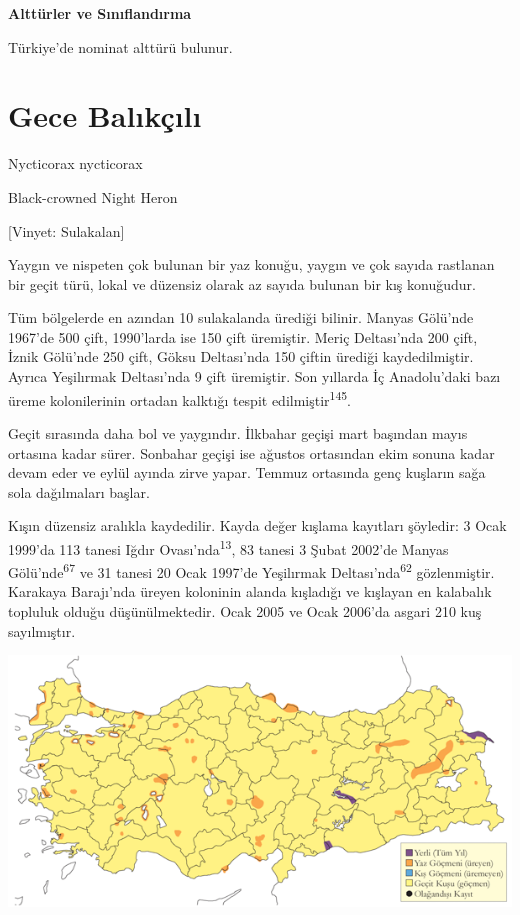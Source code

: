 \documentclass[
  letterpaper,
  DIV=11,
  numbers=noendperiod]{scrreprt}
\begin{document}
\textbf{Alttürler ve Sınıflandırma}

Türkiye'de nominat alttürü bulunur.

\section{Gece Balıkçılı}\label{gece-balux131kuxe7ux131lux131}

Nycticorax nycticorax

Black-crowned Night Heron

{[}Vinyet: Sulakalan{]}

Yaygın ve nispeten çok bulunan bir yaz konuğu, yaygın ve çok sayıda
rastlanan bir geçit türü, lokal ve düzensiz olarak az sayıda bulunan bir
kış konuğudur.

Tüm bölgelerde en azından 10 sulakalanda ürediği bilinir. Manyas
Gölü'nde 1967'de 500 çift, 1990'larda ise 150 çift üremiştir. Meriç
Deltası'nda 200 çift, İznik Gölü'nde 250 çift, Göksu Deltası'nda 150
çiftin ürediği kaydedilmiştir. Ayrıca Yeşilırmak Deltası'nda 9 çift
üremiştir. Son yıllarda İç Anadolu'daki bazı üreme kolonilerinin ortadan
kalktığı tespit edilmiştir\textsuperscript{145}.

Geçit sırasında daha bol ve yaygındır. İlkbahar geçişi mart başından
mayıs ortasına kadar sürer. Sonbahar geçişi ise ağustos ortasından ekim
sonuna kadar devam eder ve eylül ayında zirve yapar. Temmuz ortasında
genç kuşların sağa sola dağılmaları başlar.

Kışın düzensiz aralıkla kaydedilir. Kayda değer kışlama kayıtları
şöyledir: 3 Ocak 1999'da 113 tanesi Iğdır Ovası'nda\textsuperscript{13},
83 tanesi 3 Şubat 2002'de Manyas Gölü'nde\textsuperscript{67} ve 31
tanesi 20 Ocak 1997'de Yeşilırmak Deltası'nda\textsuperscript{62}
gözlenmiştir. Karakaya Barajı'nda üreyen koloninin alanda kışladığı ve
kışlayan en kalabalık topluluk olduğu düşünülmektedir. Ocak 2005 ve Ocak
2006'da asgari 210 kuş sayılmıştır.

\includegraphics{images/harita_Page_066.png}
\end{document}
